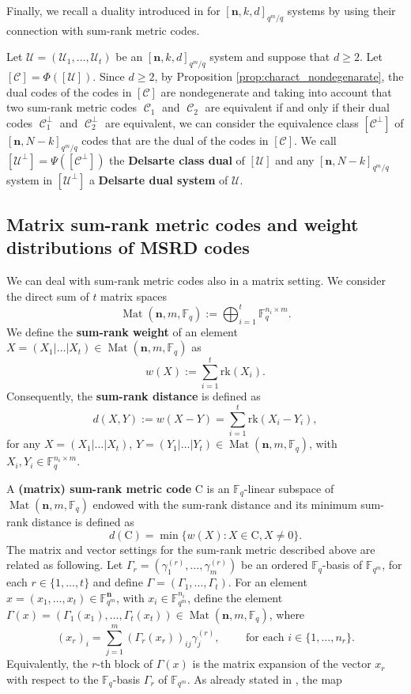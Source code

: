 \documentclass[11pt]{amsart}
\DeclareMathOperator{\C}{\mathcal{C}}
\DeclareMathOperator{\Mat}{Mat}
\theoremstyle{definition}
\newcommand{\cC}{{\mathcal C}}
\newcommand{\F}{{\mathbb F}}
\newcommand{\bfn}{\mathbf {n}}
\newcommand{\fq}{{\mathbb F}_{q}}
\newcommand{\Fmnkd}{[\bfn,k,d]_{q^m/q}}
\begin{document}
Finally, we recall a duality introduced in \cite{santonastaso2022subspace} for $\Fmnkd$ systems by using their connection with sum-rank metric codes.

Let $\mathcal{U}=(\mathcal{U}_1,\ldots,\mathcal{U}_t)$ be an $\Fmnkd$ system and suppose that $d \geq 2$. Let $[\cC]=\Phi([\mathcal{U}])$. Since $d \geq 2$, by Proposition \ref{prop:charact_nondegenarate}, the dual codes of the codes in $[\cC]$ are nondegenerate and taking into account that two sum-rank metric codes $\C_1$ and $\C_2$ are equivalent if and only if their dual codes $\C_1^{\perp}$ and $\C_2^{\perp}$ are equivalent, we can consider the equivalence class $[\cC^{\perp}]$ of $[\bfn,N-k]_{q^m/q}$ codes that are the dual of the codes in $[\cC]$. We call $[\mathcal{U}^{\perp}]=\Psi([\cC^{\perp}])$ the \textbf{Delsarte class dual} of $[\mathcal{U}]$ and any $[\bfn,N-k]_{q^m/q}$ system in $[\mathcal{U}^{\perp}]$ a \textbf{Delsarte dual system} of $\mathcal{U}$.


\subsection{Matrix sum-rank metric codes and weight distributions of MSRD codes}
We can deal with sum-rank metric codes also in a matrix setting.
We consider the direct sum of $t$ matrix spaces
\[
\Mat(\bfn,m,\F_q):=\bigoplus_{i=1}^t\F_q^{n_i \times m}.
\]
We define the \textbf{sum-rank weight} of an element $X=(X_1|\ldots|X_t) \in \Mat(\bfn,m,\F_q)$ as 
$$w(X):=\sum_{i=1}^t \mathrm{rk}(X_i).$$
Consequently, the \textbf{sum-rank distance} is defined as %
\[
d(X,Y) := w(X-Y)= \sum_{i=1}^t \mathrm{rk}(X_i - Y_i),
\]
for any $X=(X_1 \lvert \ldots \lvert X_t)$, $Y=(Y_1 \lvert \ldots \lvert Y_t) \in \Mat(\bfn,m,\F_q)$, with $X_i,Y_i \in \F_q^{n_i \times m}$. 

A \textbf{(matrix) sum-rank metric code} $\mathrm{C}$ is an $\F_q$-linear subspace of $\Mat(\bfn,m,\F_q)$ endowed with the sum-rank distance and its minimum sum-rank distance is defined as $$d(\mathrm{C})=\min\{w(X): X \in \mathrm{C}, X \neq 0\}.$$ The matrix and vector settings for the sum-rank metric described above are related as following.
Let $\Gamma_r=(\gamma_1^{(r)},\ldots,\gamma_m^{(r)})$ be an ordered $\fq$-basis of $\F_{q^m}$, for each $r \in \{1,\ldots,t\}$ and define $\Gamma=(\Gamma_1,\ldots,\Gamma_t)$. For an element $x=(x_1, \ldots ,x_t) \in \F_{q^m}^\bfn$, with $x_i \in \F_{q^m}^{n_i}$, define the element $\Gamma(x)=(\Gamma_1(x_1), \ldots, \Gamma_t(x_t)) \in \Mat(\bfn,m,\F_q)$, where
$$(x_{r})_i = \sum_{j=1}^m (\Gamma_r (x_r))_{ij}\gamma_j^{(r)}, \qquad \mbox{ for each } i \in \{1,\ldots,n_r\}.$$
Equivalently, the $r$-th block of $\Gamma(x)$ is the matrix expansion of the vector $x_r$ with respect to the $\fq$-basis $\Gamma_r$ of $\F_{q^m}$.
As already stated in \cite[Theorem 2.7]{neri2023geometry}, the map
\end{document}
